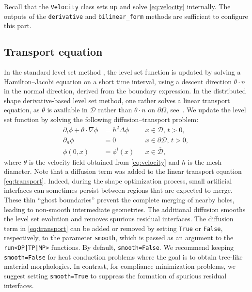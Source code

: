 \documentclass[iicol,pdflatex,sn-mathphys-ay]{sn-jnl}%
\theoremstyle{thmstyleone}%
\theoremstyle{thmstyletwo}%
\theoremstyle{thmstylethree}%
\begin{document}
Recall that the \texttt{Velocity} class sets up
and solve \eqref{eq:velocity} internally.
The outputs of the \texttt{derivative} and \texttt{bilinear\_form} methods
are sufficient to configure this part. 

\subsection{Transport equation}\label{sub:level}

In the standard level set method \cite{MR965860},
the level set function is updated by solving
a Hamilton--Jacobi equation on a short time interval,
using a descent direction $\theta\cdot n$
in the normal direction,  derived from the boundary expression.
In the distributed shape derivative-based level set method,
one rather solves a linear transport equation, as $\theta$ is available
in $\mathcal{D}$ rather than $\theta\cdot n$ on $\partial\Omega$,
see~\cite{MR3535238}.  
We update the level set function by solving the following diffusion--transport problem:
\begin{equation}\label{eq:transport}
\begin{aligned}
	\partial_t \phi+\theta\cdot\nabla\phi
		&= h^2\Delta\phi && x\in \mathcal{D},\, t>0, \\
	\partial_{n} \phi
		&= 0 && x\in \partial\mathcal{D},\, t>0, \\
	\phi(0, x)
		&= \phi^{i}(x) && x\in \overline{\mathcal{D}},
\end{aligned}
\end{equation}
where $\theta$ is the velocity field obtained from \eqref{eq:velocity}
and $h$ is the mesh diameter.
Note that a diffusion term was added to
the linear transport equation \eqref{eq:transport}.
Indeed, during the shape optimization process, small artificial interfaces
can sometimes persist between regions that are expected to merge.
These thin ``ghost boundaries'' prevent the complete merging of nearby holes,
leading to non-smooth intermediate geometries.
The additional diffusion smooths the level set evolution
and removes spurious residual interfaces.
The diffusion term in \eqref{eq:transport} can be added or removed
by setting \texttt{True} or \texttt{False}, respectively,
to the parameter \texttt{smooth},
which is passed as an argument to the \texttt{run<DP|TP|MP>} functions.
By default, \texttt{smooth=False}.
We recommend keeping \texttt{smooth=False} for heat conduction problems
where the goal is to obtain tree-like material morphologies.
In contrast, for compliance minimization problems,
we suggest setting \texttt{smooth=True} to suppress
the formation of spurious residual interfaces.
\end{document}
